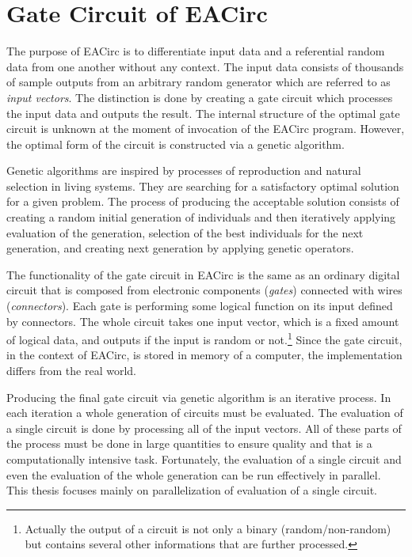 \documentclass[12pt,oneside]{fithesis2}
\begin{document}
\chapter{Gate Circuit of EACirc}

The purpose of EACirc is to differentiate input data and a referential random data from one another without any context. The input data consists of thousands of sample outputs from an arbitrary random generator which are referred to as \emph{input vectors}. The distinction is done by creating a gate circuit which processes the input data and outputs the result. The internal structure of the optimal gate circuit is unknown at the moment of invocation of the EACirc program. However, the optimal form of the circuit is constructed via a genetic algorithm.~\cite{ukrop_thesis}

Genetic algorithms are inspired by processes of reproduction and natural selection in living systems. They are searching for a satisfactory optimal solution for a given problem. The process of producing the acceptable solution consists of creating a random initial generation of individuals and then iteratively applying evaluation of the generation, selection of the best individuals for the next generation, and creating next generation by applying genetic operators.~\cite{genetic_algorithms}

The functionality of the gate circuit in EACirc is the same as an ordinary digital circuit that is composed from electronic components (\emph{gates}) connected with wires (\emph{connectors}). Each gate is performing some logical function on its input defined by connectors. The whole circuit takes one input vector, which is a fixed amount of logical data, and outputs if the input is random or not.\footnote{Actually the output of a circuit is not only a binary (random/non-random) but contains several other informations that are further processed.} Since the gate circuit, in the context of EACirc, is stored in memory of a computer, the implementation differs from the real world.

Producing the final gate circuit via genetic algorithm is an iterative process. In each iteration a whole generation of circuits must be evaluated. The evaluation of a single circuit is done by processing all of the input vectors. All of these parts of the process must be done in large quantities to ensure quality and that is a computationally intensive task. Fortunately, the evaluation of a single circuit and even the evaluation of the whole generation can be run effectively in parallel. This thesis focuses mainly on parallelization of evaluation of a single circuit.
\end{document}
